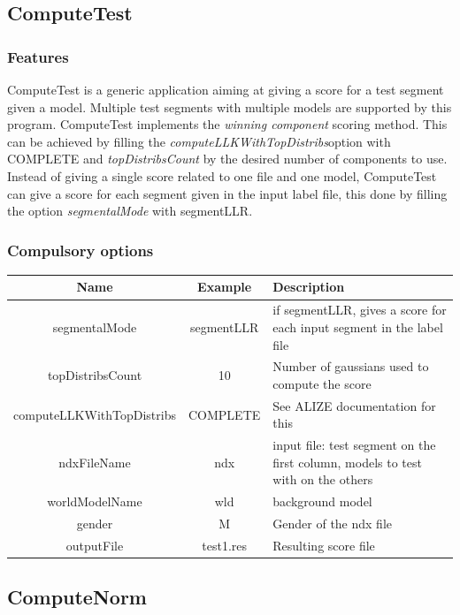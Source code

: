 \documentclass[a4paper]{article}
\begin{document}
\subsection{ComputeTest}
\subsubsection{Features}
ComputeTest  is a generic application aiming at giving a score for a
test segment given a model. Multiple test segments with multiple
models are supported by this program. ComputeTest implements the
\textit{winning component} scoring method. This can be achieved by
filling the \textit{computeLLKWithTopDistribs}option with COMPLETE
and  \textit{topDistribsCount} by the desired number of components
to use. Instead of giving a single score related to one file and one
model, ComputeTest can give a score for each segment given in the
input label file, this done by filling the option
\textit{segmentalMode} with segmentLLR.

\subsubsection{Compulsory options}

\begin{tabular}{|c|c||p{8cm}|}
\hline Name & Example & Description\\
\hline
\hline segmentalMode & segmentLLR & if segmentLLR, gives a score for each input segment in the label file\\
\hline topDistribsCount & 10 & Number of gaussians used to compute the score\\
\hline computeLLKWithTopDistribs & COMPLETE & See ALIZE documentation for this\\
\hline ndxFileName & ndx & input file: test segment on the first column, models to test with on the others\\
\hline worldModelName & wld & background model\\
\hline gender & M & Gender of the ndx file\\
\hline outputFile & test1.res & Resulting score file\\
\hline
\end{tabular}

\subsection{ComputeNorm}
\end{document}
